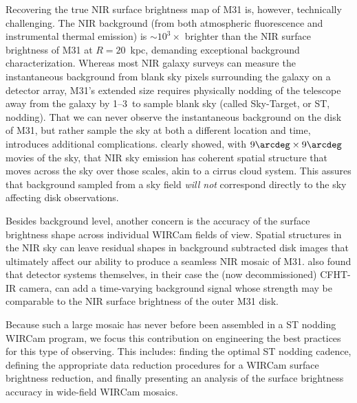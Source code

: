 \documentclass[iop]{emulateapj}
\begin{document}
Recovering the true NIR surface brightness map of M31 is, however, technically challenging.
The NIR background (from both atmospheric fluorescence and instrumental thermal emission) is $\sim 10^3\times$ brighter than the NIR surface brightness of M31 at $R=20$~kpc, demanding exceptional background characterization.
Whereas most NIR galaxy surveys can measure the instantaneous background from blank sky pixels surrounding the galaxy on a detector array, M31's extended size requires physically nodding of the telescope away from the galaxy by 1\arcdeg--3\arcdeg\ to sample blank sky (called Sky-Target, or ST, nodding).
That we can never observe the instantaneous background on the disk of M31, but rather sample the sky at both a different location and time, introduces additional complications.
\cite{Adams:1996} clearly showed, with $9\arcdeg \times 9\arcdeg$ movies of the sky, that NIR sky emission has coherent spatial structure that moves across the sky over those scales, akin to a cirrus cloud system.
This assures that background sampled from a sky field \emph{will not} correspond directly to the sky affecting disk observations.

Besides background level, another concern is the accuracy of the surface brightness shape across individual WIRCam fields of view.
Spatial structures in the NIR sky can leave residual shapes in background subtracted disk images that ultimately affect our ability to produce a seamless NIR mosaic of M31.
\cite{Vaduvescu:2004} also found that detector systems themselves, in their case the (now decommissioned) CFHT-IR camera, can add a time-varying background signal whose strength may be comparable to the NIR surface brightness of the outer M31 disk.

Because such a large mosaic has never before been assembled in a ST nodding WIRCam program, we focus this contribution on engineering the best practices for this type of observing.
This includes: finding the optimal ST nodding cadence, defining the appropriate data reduction procedures for a WIRCam surface brightness reduction, and finally presenting an analysis of the surface brightness accuracy in wide-field WIRCam mosaics.
\end{document}
